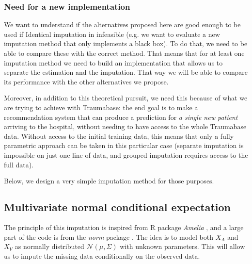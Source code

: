 			\subsubsection{Need for a new implementation}
We want to understand if the alternatives proposed here are good enough to be used if Identical imputation in infeasible (e.g. we want to evaluate a new imputation method that only implements a black box). To do that, we need to be able to compare these with the correct method. That means that for at least one imputation method we need to build an implementation that allows us to separate the estimation and the imputation. That way we will be able to compare its performance with the other alternatives we propose.

Moreover, in addition to this theoretical pursuit, we need this because of what we are trying to achieve with Traumabase: the end goal is to make a recommendation system that can produce a prediction for \emph{a single new patient} arriving to the hospital, without needing to have access to the whole Traumabase data. Without access to the initial training data, this means that only a fully parametric approach can be taken in this particular case (separate imputation is impossible on just one line of data, and grouped imputation requires access to the full data).

Below, we design a very simple imputation method for those purposes.

		\subsection{Multivariate normal conditional expectation}
The principle of this imputation is inspired from R package \emph{Amelia} \cite{ref_amelia}, and a large part of the code is from the \emph{norm} package \cite{pkg_norm}. The idea is to model both $X_A$ and $X_V$ as normally distributed $\mathcal{N}(\mu, \Sigma)$ with unknown parameters. This will allow us to impute the missing data conditionally on the observed data.

